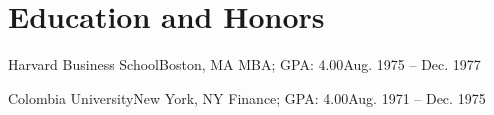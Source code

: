 \section{Education and Honors}
    \resumeSubHeadingListStart
        \resumeSubheading
            {Harvard Business School}{Boston, MA}
            {MBA;  GPA: 4.00}{Aug. 1975 -- Dec. 1977}
        
        \vspace{10pt}
        
        \resumeSubheading
            {Colombia University}{New York, NY}
            {Finance;  GPA: 4.00}{Aug. 1971 -- Dec. 1975}
    \resumeSubHeadingListEnd